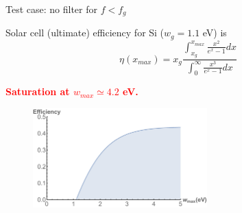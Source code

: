 \documentclass{beamer}
\begin{document}
\begin{frame}{Test case: no filter for $f < f_{g}$}

Solar cell (ultimate) efficiency for Si ($w_{g} = 1.1$ eV) is 
$$ \eta (x_{max})= x_{g}\frac{\int_{x_{g}}^{x_{max}}\frac{x^2}{e^x-1}dx}{\int_{0}^{\infty}\frac{x^3}{e^x-1}dx}$$  
\vspace{0.2cm}

\begin{center}
\textcolor{red}{\textbf{Saturation at $w_{max} \simeq 4.2$ eV.}}
\end{center}

\begin{figure} [t]
\includegraphics[width=0.6\textwidth]{figures/figure4_solar_cell_Si_efficiency_vs_wmax.pdf}
\end{figure}
\end{frame}
\end{document}
